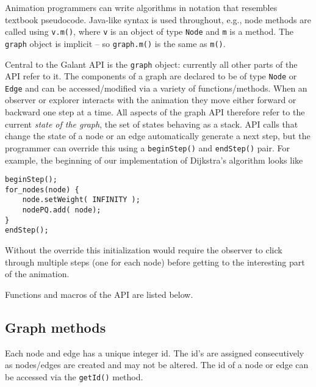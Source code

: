 
Animation programmers can write algorithms in notation that resembles
textbook pseudocode.
Java-like syntax is used throughout, e.g., node methods are called using
\texttt{v.m()}, where \texttt{v} is an object of type \texttt{Node} and \texttt{m} is a method.
The \texttt{graph} object is implicit -- so \texttt{graph.m()} is the same as \texttt{m()}.

Central to the Galant API is the \texttt{graph} object: currently all other
parts of the API refer to it.
The components of a graph are declared to be of type \texttt{Node} or
\texttt{Edge} and can be accessed/modified via a variety of
functions/methods.
When an observer or explorer interacts with the animation they move either
forward or backward one step at a time.
All aspects of the graph API therefore refer to the current \emph{state of
  the graph}, the set of states behaving as a stack.
API calls that change the state of a node or an edge automatically
generate a next step,
but the programmer can override this using a \texttt{beginStep()} and
\texttt{endStep()} pair. For example, the beginning of our implementation of
Dijkstra's algorithm looks like
\begin{verbatim}
beginStep();
for_nodes(node) {
    node.setWeight( INFINITY );
    nodePQ.add( node);
}
endStep();
\end{verbatim}
Without the override this initialization would require the observer to click
through multiple steps (one for each node) before getting to the interesting
part of the animation.

Functions and macros of the API are listed below.

\subsection{Graph methods}

Each node and edge has a unique integer id.
The id's are assigned consecutively as nodes/edges are created
and may not be altered.
The id of a node or edge can be accessed via the \texttt{getId()} method.

